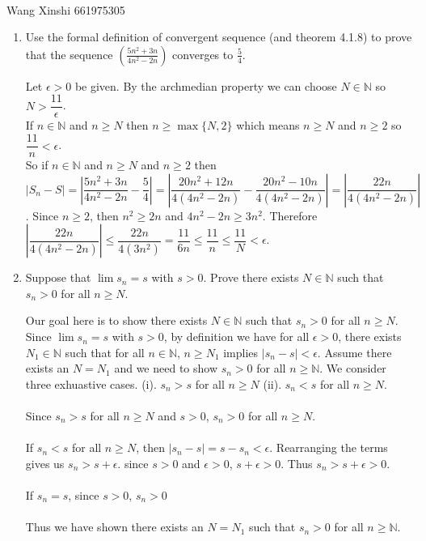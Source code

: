 \documentclass{article}
\begin{document}
\\
Wang Xinshi 661975305

\bigskip
\bigskip


\begin{enumerate}
\item Use the formal definition of convergent sequence (and theorem 4.1.8) to prove that the sequence 
$\displaystyle \left( \frac{5n^2+3n}{4n^2-2n} \right)$ converges to $\displaystyle \frac{5}{4}.$ 
\vspace{1.5em}

 Let $\epsilon>0$ be given.
By the archmedian property  we can choose $N \in \mathbb{N}$ so $N > \dfrac{11}{\epsilon}$.\\
If $n \in \mathbb{N}$ and $n \geq N$ then $n \geq \max \{N,2\}$ which means $n \geq N$ and $n \geq 2$ so $\dfrac{11}{n}<\epsilon$.\\
So if $n \in \mathbb{N}$ and $n \geq N$ and $n \geq 2$ then $|S_n - S| = \left |\dfrac{5n^2+3n}{4n^2-2n}-\dfrac{5}{4} \right | = \left |\dfrac{20n^2+12n}{4(4n^2-2n)}-\dfrac{20n^2-10n}{4(4n^2-2n)} \right | = \left |\dfrac{22n}{4(4n^2-2n)} \right |$. Since $n \geq 2$, then $n^2 \geq 2n$ and $4n^2-2n \geq 3n^2$. Therefore $\left |\dfrac{22n}{4(4n^2-2n)} \right | \leq \dfrac{22n}{4(3n^2)}= \dfrac{11}{6n} \leq \dfrac{11}{n} \leq \dfrac{11}{N} < \epsilon$.

\item Suppose that $\lim s_n = s$ with $s > 0$. Prove there exists $N \in \mathbb{N}$ such that $s_n > 0$ for all $n \ge N$.\\
\vspace{1.5em}

 Our goal here is to show there exists $N \in \mathbb{N}$ such that $s_n > 0$ for all $n \ge N$. Since $\lim s_n = s$ with $s > 0$, by definition we have for all $\epsilon>0$, there exists $N_1 \in \mathbb{N}$ such that for all $n \in \mathbb{N}$, $n \geq N_1$ implies $\left | s_n -s \right |<\epsilon$. Assume there exists an $N = N_1$ and we need to show $s_n > 0$ for all $n \geq \mathbb{N}$. We consider three exhuastive cases. (i). $s_n > s$ for all $n \geq N$ (ii). $s_n <s$ for all $n \geq N$.\\\\
Since $s_n > s$ for all $n \geq N$ and $s > 0$, $s_n > 0$ for all $n \geq N$.\\\\
If $s_n<s$ for all $n \geq N$, then $\left | s_n -s \right | = s - s_n < \epsilon$. Rearranging the terms gives us $s_n > s+\epsilon$. since $s>0$ and $\epsilon>0$, $s+ \epsilon>0$. Thus $s_n > s+\epsilon>0$.\\\\
If $s_n = s$, since $s>0$, $s_n>0$\\\\
Thus we have shown there exists an $N = N_1$ such that $s_n > 0$ for all $n \geq \mathbb{N}$.



\end{enumerate}
\end{document}
